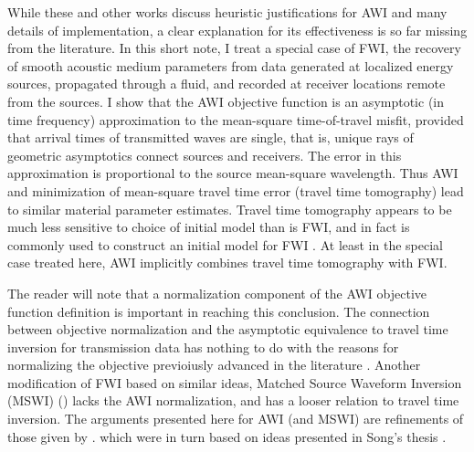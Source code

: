 While these and other works discuss heuristic justifications for AWI
and many details of implementation, a clear explanation for its
effectiveness is so far missing from the literature. In this short
note, I treat a special case of FWI, the recovery of smooth acoustic
medium parameters from data generated at localized energy sources,
propagated through a fluid, and recorded at receiver locations remote
from the sources. I show that the AWI objective function is an
asymptotic (in time frequency) approximation to the mean-square
time-of-travel misfit, provided that arrival times of transmitted
waves are single, that is, unique rays of geometric asymptotics
connect sources and receivers. The error in this approximation is
proportional to the source mean-square wavelength. Thus AWI and
minimization of mean-square travel time error (travel time tomography)
lead to similar material parameter estimates. Travel time tomography
appears to be much less sensitive to choice of initial model than is
FWI, and in fact is commonly used to construct an initial model for
FWI \cite[]{Bordingetal:87,SirguePratt:04,VirieuxOperto:09}. At least
in the special case treated here, AWI implicitly combines travel time
tomography with FWI.

The reader will
note that a normalization component of the AWI objective function
definition is important in reaching this conclusion. The connection
between objective normalization and the asymptotic equivalence to
travel time inversion for transmission data has nothing to do with the
reasons for normalizing the objective previoiusly advanced in the
literature \cite[]{Warner:16,LiAlkhalifah:21}. Another modification of
FWI based on similar ideas, Matched Source Waveform Inversion (MSWI)
(\cite{HuangSymes2015SEG,HuangSymes:Geo17}) lacks the AWI
normalization, and has a looser relation to travel time inversion. The
arguments presented here for AWI (and MSWI) are refinements of those
given by \cite{HuangSymes:Geo17}. which were in turn based on ideas
presented in Song's thesis \cite[]{Song:94c}.

